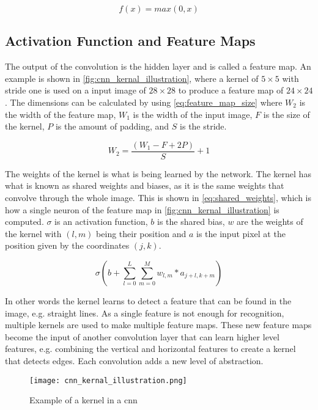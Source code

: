 \begin{equation}
\label{eq:ReluFunction}
f(x) = max(0,x)
\end{equation}

\subsection{Activation Function and Feature Maps}
The output of the convolution is the hidden layer and is called a feature map. An example is shown in \autoref{fig:cnn_kernal_illustration}, where a kernel of $5\times5$ with stride one is used on a input image of $28\times28$ to produce a feature map of $24\times24$. The dimensions can be calculated by using \autoref{eq:feature_map_size}  where $W_2$ is the width of the feature map, $W_1$ is the width of the input image, $F$ is the size of the kernel, $P$ is the amount of padding, and $S$ is the stride.  

\begin{equation}
\label{eq:feature_map_size}
W_2 = \frac{(W_1-F+2P)}{S} +1
\end{equation}

The weights of the kernel is what is being learned by the network. The kernel has what is known as shared weights and biases, as it is the same weights that convolve through the whole image. This is shown in \autoref{eq:shared_weights}, which is how a single neuron of the feature map in \autoref{fig:cnn_kernal_illustration} is computed. $\sigma$ is an activation function, $b$ is the shared bias,  $w$ are the weights of the kernel with $(l,m)$ being their position and $a$ is the input pixel at the position given by the coordinates $(j,k)$.

\begin{equation}
\label{eq:shared_weights}
\sigma(b+\sum\limits_{l=0}^L \sum\limits_{m=0}^M w_{l,m}*a_{j+l,k+m})
\end{equation}


In other words the kernel learns to detect a feature that can be found in the image, e.g. straight lines. As a single feature is not enough for recognition, multiple kernels are used to make multiple feature maps. These new feature maps become the input of another convolution layer that can learn higher level features, e.g. combining the vertical and horizontal features to create a kernel that detects edges. Each convolution adds a new level of abstraction.

\begin{figure}[h]
\centering
\texttt{[image: cnn\_kernal\_illustration.png]}
\caption{Example of a kernel in a \gls{cnn} \citep{Nielsen2015}}
\label{fig:cnn_kernal_illustration}
\end{figure}
\clearpage
